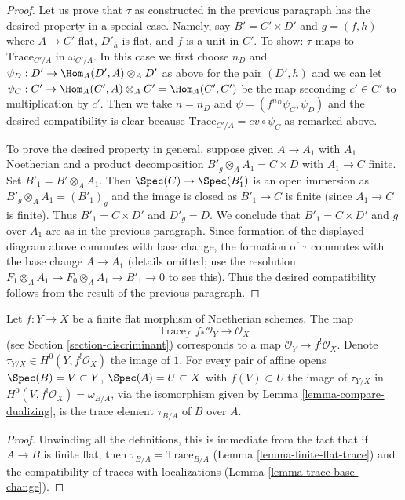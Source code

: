 \begin{proof}
\medskip\noindent
Let us prove that $\tau$ as constructed in the previous paragraph
has the desired property in a special case. Namely, say
$B' = C' \times D'$ and $g = (f, h)$ where $A \to C'$ flat, $D'_h$ is flat, and
$f$ is a unit in $C'$.
To show: $\tau$ maps to $\text{Trace}_{C'/A}$ in $\omega_{C'/A}$.
In this case we first choose $n_D$ and
$\psi_D : D' \to \Hom_A(D', A) \otimes_A D'$ as above for the pair
$(D', h)$ and we can let
$\psi_C : C' \to \Hom_A(C', A) \otimes_A C' = \Hom_A(C', C')$
be the map seconding $c' \in C'$ to multiplication by $c'$.
Then we take $n = n_D$ and $\psi = (f^{n_D} \psi_C, \psi_D)$
and the desired compatibility is clear because
$\text{Trace}_{C'/A} = ev \circ \psi_C$ as remarked above.

\medskip\noindent
To prove the desired property in general, suppose given
$A \to A_1$ with $A_1$ Noetherian and a product decomposition
$B'_g \otimes_A A_1 = C \times D$ with $A_1 \to C$ finite.
Set $B'_1 = B' \otimes_A A_1$. Then $\Spec(C) \to \Spec(B'_1)$
is an open immersion as $B'_g \otimes_A A_1 = (B'_1)_g$ and
the image is closed as $B'_1 \to C$ is finite (since $A_1 \to C$
is finite). Thus $B'_1 = C \times D'$ and $D'_g = D$.
We conclude that $B'_1 = C \times D'$ and $g$ over $A_1$
are as in the previous paragraph.
Since formation of the displayed diagram above
commutes with base change, the formation of $\tau$ commutes
with the base change $A \to A_1$ (details omitted; use the
resolution $F_1 \otimes_A A_1 \to F_0 \otimes_A A_1 \to B'_1 \to 0$
to see this). Thus the desired compatibility follows from the result
of the previous paragraph.
\end{proof}

\begin{lemma}
\label{lemma-compare-trace}
Let $f : Y \to X$ be a finite flat morphism of Noetherian schemes.
The map
$$
\text{Trace}_f : f_*\mathcal{O}_Y \longrightarrow \mathcal{O}_X
$$
(see Section \ref{section-discriminant})
corresponds to a map $\mathcal{O}_Y \to f^!\mathcal{O}_X$.
Denote $\tau_{Y/X} \in H^0(Y, f^!\mathcal{O}_X)$ the image of $1$.
For every pair of affine opens $\Spec(B) = V \subset Y$,
$\Spec(A) = U \subset X$ with $f(V) \subset U$
the image of $\tau_{Y/X}$ in $H^0(V, f^!\mathcal{O}_X) = \omega_{B/A}$,
via the isomorphism given by Lemma \ref{lemma-compare-dualizing},
is the trace element $\tau_{B/A}$ of $B$ over $A$.
\end{lemma}

\begin{proof}
Unwinding all the definitions, this is immediate from the fact
that if $A \to B$ is finite flat, then $\tau_{B/A} = \text{Trace}_{B/A}$
(Lemma \ref{lemma-finite-flat-trace}) and the compatibility
of traces with localizations (Lemma \ref{lemma-trace-base-change}).
\end{proof}

